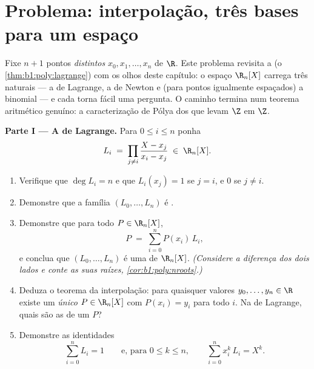 \section{Problema: interpolação, três bases para um espaço}

\begin{problem}\label{pb:b1:vspaces:1}
Fixe $n + 1$ pontos \emph{distintos} $x_0, x_1, \dots, x_n$ de $\R$.
Este problema revisita a 
(o \cref{thm:b1:poly:lagrange}) com os olhos deste capítulo: o
espaço $\R_n[X]$ carrega três  naturais --- a de Lagrange,
a de Newton e (para pontos igualmente espaçados) a  binomial ---
e cada  torna fácil uma pergunta. O caminho termina num teorema
aritmético genuíno: a caracterização de Pólya dos  que
levam $\Z$ em $\Z$.

\medskip
\noindent\textbf{Parte I --- A  de Lagrange.} Para $0 \leq i
\leq n$ ponha
\[
L_i \;=\; \prod_{j \neq i} \frac{X - x_j}{x_i - x_j} \;\in\;
\R_n[X].
\]
\begin{enumerate}
  \item Verifique que $\deg L_i = n$ e que $L_i(x_j) = 1$ se $j =
        i$, e $0$ se $j \neq i$.
  \item Demonstre que a família $(L_0, \dots, L_n)$ é .
  \item Demonstre que para todo $P \in \R_n[X]$,
        \[
        P \;=\; \sum_{i=0}^{n} P(x_i)\, L_i ,
        \]
        e conclua que $(L_0, \dots, L_n)$ é uma  de
        $\R_n[X]$. \emph{(Considere a diferença dos dois lados
        e conte as suas raízes, \cref{cor:b1:poly:nroots}.)}
  \item Deduza o teorema da interpolação: para quaisquer valores
        $y_0,
        \dots, y_n \in \R$ existe um \emph{único} $P \in
        \R_n[X]$ com $P(x_i) = y_i$ para todo $i$.
        Na  de Lagrange, quais são as  de um
         $P$?
  \item Demonstre as identidades
        \[
        \sum_{i=0}^{n} L_i = 1
        \qquad\text{e, para } 0 \leq k \leq n,\qquad
        \sum_{i=0}^{n} x_i^{k}\, L_i = X^{k} .
        \]
\end{enumerate}


\end{problem}
